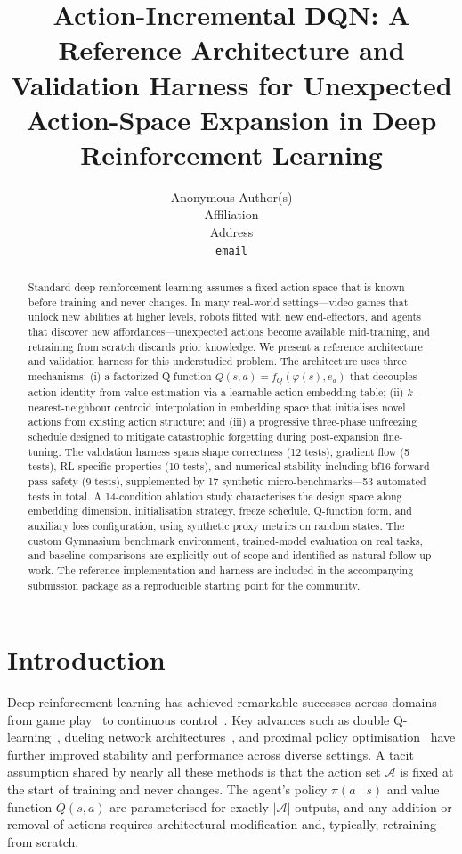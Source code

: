 \documentclass{article}
\title{Action-Incremental DQN: A Reference Architecture and Validation Harness
  for Unexpected Action-Space Expansion in Deep Reinforcement Learning}
\author{%
  Anonymous Author(s) \\
  Affiliation \\
  Address \\
  \texttt{email} \\
}
\begin{document}
\maketitle

\begin{abstract}
Standard deep reinforcement learning assumes a fixed action space that is known
before training and never changes. In many real-world settings---video games that
unlock new abilities at higher levels, robots fitted with new end-effectors, and
agents that discover new affordances---unexpected actions become available
mid-training, and retraining from scratch discards prior knowledge. We present a
reference architecture and validation harness for this understudied problem. The
architecture uses three mechanisms: (i) a factorized Q-function
$Q(s,a)=f_Q(\varphi(s),e_a)$ that decouples action identity from value
estimation via a learnable action-embedding table; (ii) $k$-nearest-neighbour
centroid interpolation in embedding space that initialises novel actions from
existing action structure; and (iii) a progressive three-phase unfreezing
schedule designed to mitigate catastrophic forgetting during post-expansion
fine-tuning. The validation harness spans shape correctness (12 tests), gradient
flow (5 tests), RL-specific properties (10 tests), and numerical stability
including bf16 forward-pass safety (9 tests), supplemented by 17 synthetic
micro-benchmarks---53 automated tests in total. A 14-condition ablation study
characterises the design space along embedding dimension, initialisation
strategy, freeze schedule, Q-function form, and auxiliary loss configuration,
using synthetic proxy metrics on random states. The custom Gymnasium benchmark
environment, trained-model evaluation on real tasks, and baseline comparisons
are explicitly out of scope and identified as natural follow-up work. The
reference implementation and harness are included in the accompanying
submission package as a reproducible starting point for the community.
\end{abstract}


\section{Introduction}

Deep reinforcement learning has achieved remarkable successes across domains
from game play~\cite{mnih2015human, mnih2013playing} to continuous
control~\cite{lillicrap2015continuous}. Key advances such as double
Q-learning~\cite{vanhasselt2016deep}, dueling network
architectures~\cite{wang2016dueling}, and proximal policy
optimisation~\cite{schulman2017proximal} have further improved stability and
performance across diverse settings. A tacit assumption shared by nearly all
these methods is that the action set $\mathcal{A}$ is fixed at the start of
training and never changes. The agent's policy $\pi(a \mid s)$ and value
function $Q(s,a)$ are parameterised for exactly $|\mathcal{A}|$ outputs, and
any addition or removal of actions requires architectural modification and,
typically, retraining from scratch.
\end{document}
